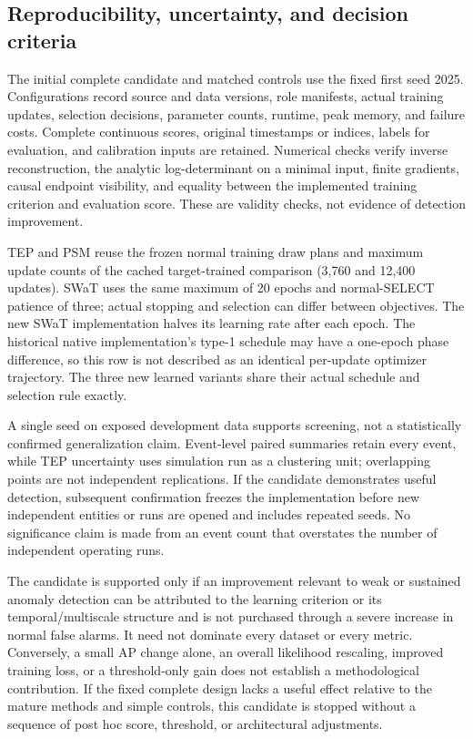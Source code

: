 \documentclass[
  english,
]{article}
\begin{document}
\subsection{Reproducibility, uncertainty, and decision
criteria}\label{reproducibility-uncertainty-and-decision-criteria}

The initial complete candidate and matched controls use the fixed first
seed 2025. Configurations record source and data versions, role
manifests, actual training updates, selection decisions, parameter
counts, runtime, peak memory, and failure costs. Complete continuous
scores, original timestamps or indices, labels for evaluation, and
calibration inputs are retained. Numerical checks verify inverse
reconstruction, the analytic log-determinant on a minimal input, finite
gradients, causal endpoint visibility, and equality between the
implemented training criterion and evaluation score. These are validity
checks, not evidence of detection improvement.

TEP and PSM reuse the frozen normal training draw plans and maximum
update counts of the cached target-trained comparison (3,760 and 12,400
updates). SWaT uses the same maximum of 20 epochs and normal-SELECT
patience of three; actual stopping and selection can differ between
objectives. The new SWaT implementation halves its learning rate after
each epoch. The historical native implementation's type-1 schedule may
have a one-epoch phase difference, so this row is not described as an
identical per-update optimizer trajectory. The three new learned
variants share their actual schedule and selection rule exactly.

A single seed on exposed development data supports screening, not a
statistically confirmed generalization claim. Event-level paired
summaries retain every event, while TEP uncertainty uses simulation run
as a clustering unit; overlapping points are not independent
replications. If the candidate demonstrates useful detection, subsequent
confirmation freezes the implementation before new independent entities
or runs are opened and includes repeated seeds. No significance claim is
made from an event count that overstates the number of independent
operating runs.

The candidate is supported only if an improvement relevant to weak or
sustained anomaly detection can be attributed to the learning criterion
or its temporal/multiscale structure and is not purchased through a
severe increase in normal false alarms. It need not dominate every
dataset or every metric. Conversely, a small AP change alone, an overall
likelihood rescaling, improved training loss, or a threshold-only gain
does not establish a methodological contribution. If the fixed complete
design lacks a useful effect relative to the mature methods and simple
controls, this candidate is stopped without a sequence of post hoc
score, threshold, or architectural adjustments.


\end{document}
